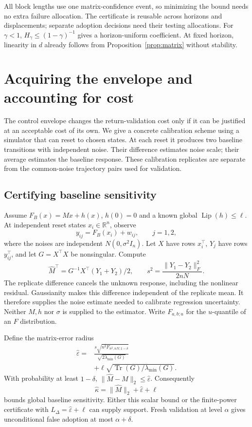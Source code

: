 \documentclass[twocolumn,nameyear]{autart}
\begin{document}
All block lengths use one matrix-confidence event, so minimizing the
bound needs no extra failure allocation. The certificate is reusable
across horizons and displacements; separate adoption decisions need
their testing allocations. For $\gamma<1$, $H_\gamma\le(1-\gamma)^{-1}$
gives a horizon-uniform coefficient. At fixed horizon, linearity in $d$
already follows from Proposition~\ref{prop:matrix} without stability.

\section{Acquiring the envelope and accounting for cost}\label{sec:calibration}
The control envelope changes the return-validation cost only if it can
be justified at an acceptable cost of its own. We give a concrete
calibration scheme using a simulator that can reset to chosen states.
At each reset it produces two baseline transitions with independent
noise. Their difference estimates noise scale; their average estimates
the baseline response. These calibration replicates are separate from
the common-noise trajectory pairs used for validation.

\subsection{Certifying baseline sensitivity}
Assume $F_B(x)=Mx+h(x)$, $h(0)=0$ and a known global
$\operatorname{Lip}(h)\le\ell$. At independent reset states
$x_i\in\mathbb{R}^n$, observe
\[
 y_{ij}=F_B(x_i)+w_{ij},\qquad j=1,2,
\]
where the noises are independent $N(0,\sigma^2I_n)$. Let $X$ have
rows $x_i^\top$, $Y_j$ have rows $y_{ij}^\top$, and let
$G=X^\top X$ be nonsingular. Compute
\[
 \widehat M^\top=G^{-1}X^\top(Y_1+Y_2)/2,
 \qquad s^2=\frac{\|Y_1-Y_2\|_F^2}{2nN}.
\]
The replicate difference cancels the unknown response, including the
nonlinear residual. Gaussianity makes this difference independent of
the replicate mean. It therefore supplies the noise estimate needed to
calibrate regression uncertainty. Neither $M,h$ nor $\sigma$ is supplied
to the estimator. Write $F_{a,b;u}$ for the $u$-quantile of an
$F$ distribution.

\begin{prop}\label{prop:calibration}
Define the matrix-error radius
\begin{align}\label{eq:matrix-radius}
 \widehat\varepsilon={}&
 \frac{s\sqrt{n^2F_{n^2,nN;1-\delta}}}
      {\sqrt{2\lambda_{\min}(G)}}\nonumber\\
 &+\ell\sqrt{\operatorname{Tr}(G)/\lambda_{\min}(G)}.
\end{align}
With probability at least $1-\delta$,
$\|\widehat M-M\|_2\le\widehat\varepsilon$. Consequently
\begin{equation}\label{eq:kappa-hat}
 \widehat\kappa=\|\widehat M\|_2+\widehat\varepsilon+\ell
\end{equation}
bounds global baseline sensitivity. Either this scalar bound or the
finite-power certificate with $L_\Delta=\widehat\varepsilon+\ell$
can supply support. Fresh validation at level $\alpha$ gives
unconditional false adoption at most $\alpha+\delta$.
\end{prop}
\end{document}
